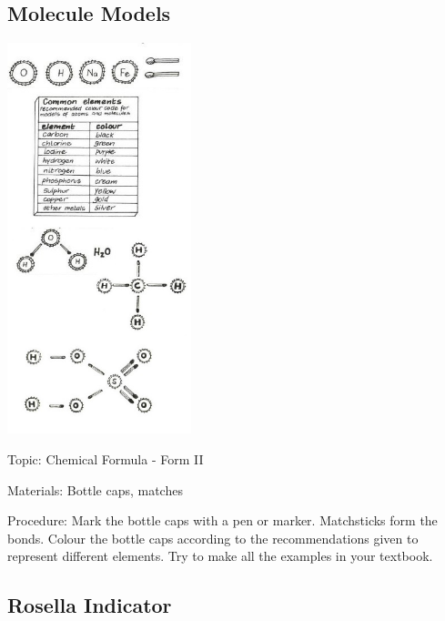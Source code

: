 \begin{multicols}{2}
\subsection{Molecule Models} %

\begin{center}
\includegraphics[width=0.4\textwidth]{./img/vso/molecule-model.jpg}
\end{center}

\begin{description*}
\item[Topic:]{Chemical Formula - Form II}
\item[Materials:]{Bottle caps, matches}
\item[Procedure:]{Mark the bottle caps with a pen or marker. Matchsticks form the bonds. Colour the bottle caps according to the recommendations given to represent different elements. Try to make all the examples in your textbook.}
\end{description*}

\subsection{Rosella Indicator}


\end{multicols}

